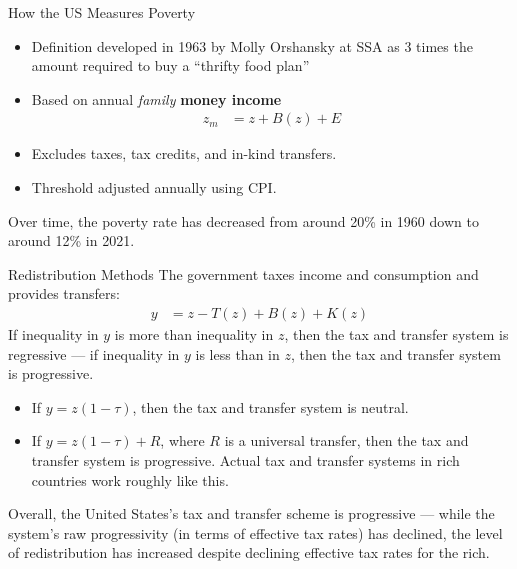 \documentclass[8pt]{extarticle}
\begin{document}
  \begin{problem}{How the US Measures Poverty}
    \begin{itemize}
      \item Definition developed in 1963 by Molly Orshansky at SSA as 3 times the amount required to buy a ``thrifty food plan''
      \item Based on annual \textit{family} \textbf{money income}
        \begin{align*}
          z_{m} &= z + B(z) + E
        \end{align*}
      \item Excludes taxes, tax credits, and in-kind transfers.
      \item Threshold adjusted annually using CPI.
    \end{itemize}
    Over time, the poverty rate has decreased from around 20\% in 1960 down to around 12\% in 2021.
  \end{problem}
  \begin{problem}{Redistribution Methods}
    The government taxes income and consumption and provides transfers:
    \begin{align*}
      y &= z - T(z) + B(z) + K(z)
    \end{align*}
    If inequality in $y$ is more than inequality in $z$, then the tax and transfer system is regressive --- if inequality in $y$ is less than in $z$, then the tax and transfer system is progressive.
    \begin{itemize}
      \item If $y = z(1-\tau)$, then the tax and transfer system is neutral.
      \item If $y = z(1-\tau) + R$, where $R$ is a universal transfer, then the tax and transfer system is progressive. Actual tax and transfer systems in rich countries work roughly like this.
    \end{itemize}
    Overall, the United States's tax and transfer scheme is progressive --- while the system's raw progressivity (in terms of effective tax rates) has declined, the level of redistribution has increased despite declining effective tax rates for the rich.
  \end{problem}
\end{document}
